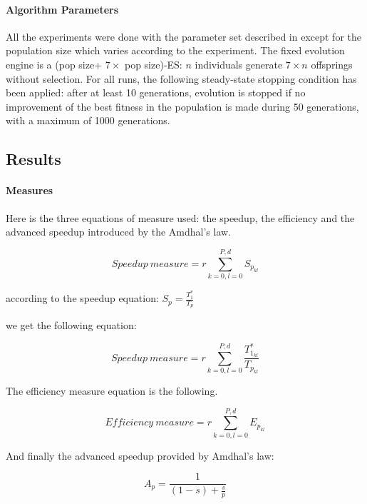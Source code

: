 \documentclass{sig-alternate}
\begin{document}
\paragraph{Algorithm Parameters} %

All the experiments were done with the parameter set described in \cite{dae:icaps2010} except for the population size which varies according to the experiment.
The fixed evolution engine is a (pop size+ $7 \times$ pop size)-ES: $n$ individuals generate $7 \times n$ offsprings without selection.
For all runs, the following steady-state stopping condition has been applied: after at least 10 generations, evolution is stopped if no improvement of the best fitness in the
population is made during 50 generations, with a maximum of 1000 generations.

\subsection{Results}



\paragraph{Measures}


Here is the three equations of measure used: the speedup, the efficiency and the advanced speedup introduced by the Amdhal's law.

$$Speedup\ measure = r \sum^{P,d}_{k=0,l=0} S_{p_{kl}}$$

according to the speedup equation: $S_p = \frac{T^*_1}{T_p}$

we get the following equation:

$$Speedup\ measure = r \sum^{P,d}_{k=0,l=0} \frac{T^*_{1_{kl}}}{T_{p_{kl}}}$$

The efficiency measure equation is the following.

$$Efficiency\ measure = r \sum^{P,d}_{k=0,l=0} E_{p_{kl}}$$

And finally the advanced speedup provided by Amdhal's law:

$$A_p = \frac{1}{(1-s) + \frac{s}{p}}$$
\end{document}
